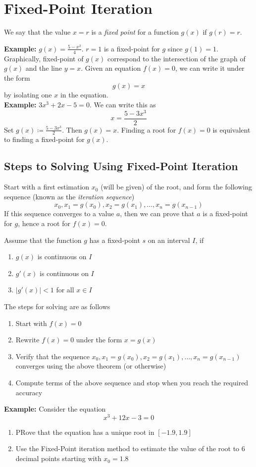 \documentclass[openany]{report}
\begin{document}
\section{Fixed-Point Iteration}
\begin{definition}
    We say that the value $x = r$ is a \emph{fixed point} for a function $g(x)$ if $g(r) = r$.
\end{definition}
\noindent
\textbf{Example:} $g(x) = \frac{5-x^2}{4}$. $r = 1$ is a fixed-point for $g$ since $g(1) = 1$.\\[2ex]
Graphically, fixed-point of $g(x)$ correspond to the intersection of the graph of $g(x)$ and the line $y = x$. Given an equation $f(x) = 0$, we can write it under the form 
\[g(x) = x\]
by isolating one $x$ in the equation.\\[2ex]
\textbf{Example:} $3x^3 + 2x - 5 = 0$. We can write this as 
\[x = \frac{5-3x^3}{2}\]
Set $g(x) \coloneqq \frac{5-3x^3}{2}$. Then $g(x) = x$. Finding a root for $f(x) = 0$ is equivalent to finding a fixed-point for $g(x)$.\\[2ex]
\subsection{Steps to Solving Using Fixed-Point Iteration}
 Start with a first estimation $x_0$ (will be given) of the root, and form the following sequence (known as the \emph{iteration sequence})
    \[x_0, x_1 = g(x_0), x_2 = g(x_1), \dots, x_n = g(x_{n-1})\]
If this sequence converges to a value $a$, then we can prove that $a$ is a fixed-point for $g$, hence a root for $f(x) = 0$.
\begin{theorem}
    Assume that the function $g$ has a fixed-point $s$ on an interval $I$, if 
    \begin{enumerate}[label=(\roman*)]
        \item $g(x)$ is continuous on $I$
        \item $g'(x)$ is continuous on $I$
        \item $|g'(x)| < 1$ for all $x \in I$
    \end{enumerate}
\end{theorem}
\noindent
The steps for solving are as follows 
\begin{enumerate}
    \item Start with $f(x) = 0$
    \item Rewrite $f(x) = 0$ under the form $x = g(x)$
    \item Verify that the sequence $x_0, x_1 = g(x_0), x_2 = g(x_1), \dots, x_n = g(x_{n-1})$ converges using the above theorem (or otherwise)
    \item Compute terms of the above sequence and stop when you reach the required accuracy
\end{enumerate}
\textbf{Example:} Consider the equation 
\[x^3 + 12x - 3 = 0\]
\begin{enumerate}
    \item PRove that the equation has a unique root in $[-1.9, 1.9]$
    \item Use the Fixed-Point iteration method to estimate the value of the root to 6 decimal points starting with $x_0 = 1.8$
\end{enumerate}
\end{document}
